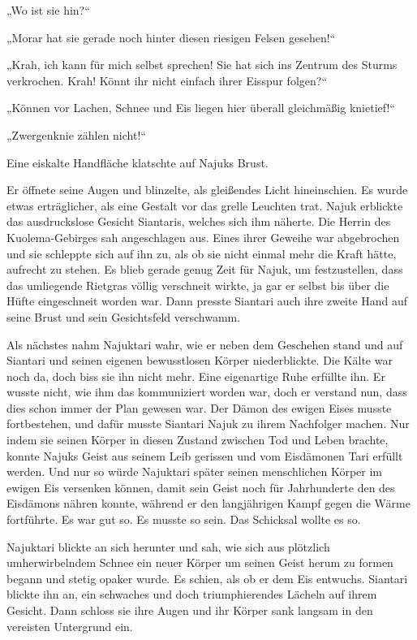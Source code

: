 \documentclass[10pt, a4paper, oneside]{book}
\begin{document}
„Wo ist sie hin?“

„Morar hat sie gerade noch hinter diesen riesigen Felsen gesehen!“

„Krah, ich kann für mich selbst sprechen! Sie hat sich ins Zentrum des Sturms verkrochen. Krah! Könnt ihr nicht einfach ihrer Eisspur folgen?“

„Können vor Lachen, Schnee und Eis liegen hier überall gleichmäßig knietief!“

„Zwergenknie zählen nicht!“

Eine eiskalte Handfläche klatschte auf Najuks Brust.

Er öffnete seine Augen und blinzelte, als gleißendes Licht hineinschien. Es wurde etwas erträglicher, als eine Gestalt vor das grelle Leuchten trat. Najuk erblickte das ausdruckslose Gesicht Siantaris, welches sich ihm näherte. Die Herrin des Kuolema-Gebirges sah angeschlagen aus. Eines ihrer Geweihe war abgebrochen und sie schleppte sich auf ihn zu, als ob sie nicht einmal mehr die Kraft hätte, aufrecht zu stehen. Es blieb gerade genug Zeit für Najuk, um festzustellen, dass das umliegende Rietgras völlig verschneit wirkte, ja gar er selbst bis über die Hüfte eingeschneit worden war. Dann presste Siantari auch ihre zweite Hand auf seine Brust und sein Gesichtsfeld verschwamm.

Als nächstes nahm Najuktari wahr, wie er neben dem Geschehen stand und auf Siantari und seinen eigenen bewusstlosen Körper niederblickte. Die Kälte war noch da, doch biss sie ihn nicht mehr. Eine eigenartige Ruhe erfüllte ihn. Er wusste nicht, wie ihm das kommuniziert worden war, doch er verstand nun, dass dies schon immer der Plan gewesen war. Der Dämon des ewigen Eises musste fortbestehen, und dafür musste Siantari Najuk zu ihrem Nachfolger machen. Nur indem sie seinen Körper in diesen Zustand zwischen Tod und Leben brachte, konnte Najuks Geist aus seinem Leib gerissen und vom Eisdämonen Tari erfüllt werden. Und nur so würde Najuktari später seinen menschlichen Körper im ewigen Eis versenken können, damit sein Geist noch für Jahrhunderte den des Eisdämons nähren konnte, während er den langjährigen Kampf gegen die Wärme fortführte. Es war gut so. Es musste so sein. Das Schicksal wollte es so.

Najuktari blickte an sich herunter und sah, wie sich aus plötzlich umherwirbelndem Schnee ein neuer Körper um seinen Geist herum zu formen begann und stetig opaker wurde. Es schien, als ob er dem Eis entwuchs. Siantari blickte ihn an, ein schwaches und doch triumphierendes Lächeln auf ihrem Gesicht. Dann schloss sie ihre Augen und ihr Körper sank langsam in den vereisten Untergrund ein.
\end{document}
